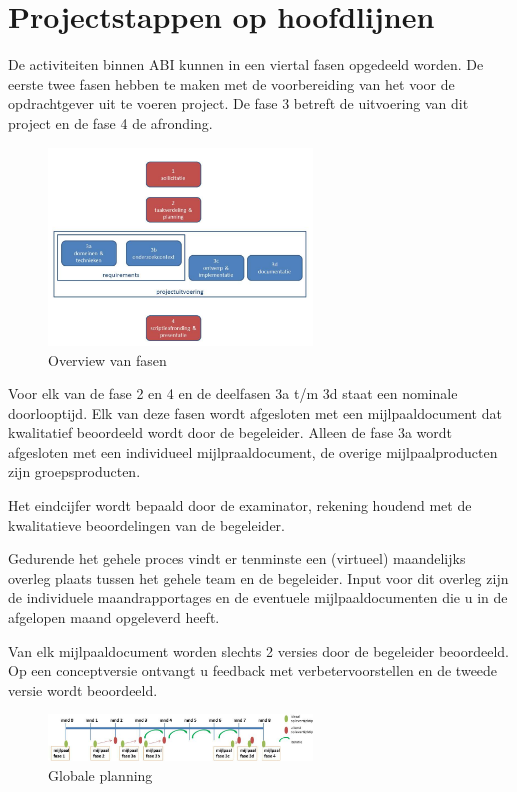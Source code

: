 \section{Projectstappen op hoofdlijnen}
De activiteiten binnen ABI kunnen in een viertal fasen opgedeeld worden.
De eerste twee fasen hebben te maken met de voorbereiding van het voor de
opdrachtgever uit te voeren project. De fase 3 betreft de uitvoering van dit
project en de fase 4 de afronding.

\begin{figure}
\includegraphics[width=7cm]{./overview.jpg}
 \caption{Overview van fasen}
 \label{fig:overview}
\end{figure}

Voor elk van de fase 2 en 4 en de deelfasen 3a t/m 3d staat een nominale
doorlooptijd. Elk van deze fasen wordt afgesloten met een mijlpaaldocument
dat kwalitatief beoordeeld wordt door de begeleider. Alleen de fase 3a
wordt afgesloten met een individueel mijlpraaldocument,  de overige mijlpaalproducten
zijn groepsproducten.

Het eindcijfer wordt bepaald door de examinator, rekening houdend met de
kwalitatieve beoordelingen van de begeleider.

Gedurende het gehele proces vindt er tenminste een (virtueel) maandelijks
overleg plaats tussen het gehele team en de begeleider. Input voor dit
overleg zijn de individuele maandrapportages en de eventuele mijlpaaldocumenten
die u in de afgelopen maand opgeleverd heeft.

Van elk mijlpaaldocument worden slechts 2 versies door de begeleider
beoordeeld. Op een conceptversie ontvangt u feedback met
verbetervoorstellen en de tweede versie wordt beoordeeld.

\begin{figure}%
 \centering
 \includegraphics[width=7cm]{./globale-tijdsplanning.jpg}
 \caption{Globale planning}
 \label{fig:globale-planning}
\end{figure}

